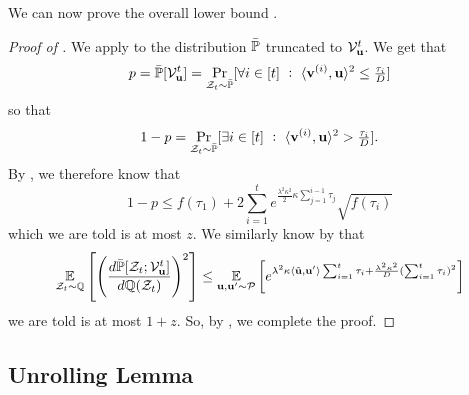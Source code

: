 We can now prove the overall lower bound .
\begin{proof}[Proof of ]
We apply  to the distribution \(\bar{{\mathbb P}}\) truncated to \({\mathcal V}_{\boldsymbol{\mathrm{u}}}^t\).
We get that
\[
    p
    = \bar{{\mathbb P}}[{\mathcal V}_{\boldsymbol{\mathrm{u}}}^t]
    = \Pr_{{\mathcal Z}_t\sim\bar{{\mathbb P}}}[\forall i \in [t] ~:~ \langle \boldsymbol{\mathrm{v}}^{(i)}, \boldsymbol{\mathrm{u}}\rangle^2 \leq {{\textstyle\frac{\tau_i}{D}}}]
\]
so that
\[
    1-p
    = \Pr_{{\mathcal Z}_t\sim\bar{{\mathbb P}}}[\exists i \in [t] ~:~ \langle \boldsymbol{\mathrm{v}}^{(i)}, \boldsymbol{\mathrm{u}}\rangle^2 > {{\textstyle\frac{\tau_i}{D}}}].
\]
By , we therefore know that
\[
    1-p
    \leq f(\tau_1) + 2\sum_{i=1}^t
        e^{\frac{\lambda^2\kappa^2}{2}\kappa\sum_{j=1}^{i-1}\tau_j}
        \sqrt{f(\tau_i)}
\]
which we are told is at most \(z\).
We similarly know by  that
\[
    \operatorname*{\mathbb{E}}_{{\mathcal Z}_t\sim{\mathbb Q}} \left[\left(\frac{d\bar{{\mathbb P}}[{\mathcal Z}_t;{\mathcal V}_{\boldsymbol{\mathrm{u}}}^t]}{d{\mathbb Q}({\mathcal Z}_t)}\right)^2\right]
        \leq \operatorname*{\mathbb{E}}_{\boldsymbol{\mathrm{u}},\boldsymbol{\mathrm{u}}'\sim{\mathcal P}}\left[
            e^{
                \lambda^2 \kappa \langle\tilde{\boldsymbol{\mathrm{u}}},\boldsymbol{\mathrm{u}}'\rangle \sum_{i=1}^t \tau_i
                +
                \frac{\lambda^2 \kappa^2}{D} (\sum_{i=1}^t \tau_i)^2
        }\right]
\]
we are told is at most \(1+z\).
So, by , we complete the proof.
\end{proof}

\subsection{Unrolling Lemma}

